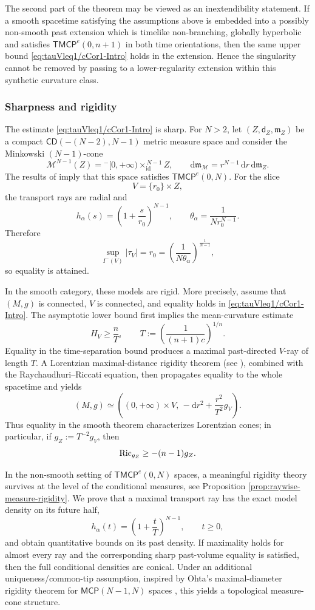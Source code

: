 \documentclass[a4paper,10pt]{article}
\newcommand{\CD}{\mathsf{CD}}
\newcommand{\MCP}{\mathsf{MCP}}
\newcommand{\Ric}{{\rm Ric}}
\newcommand{\TMCP}{\mathsf{TMCP}}
\newcommand{\mm}{\mathfrak m}
\newcommand{\sfd}{\mathsf d}
\theoremstyle{plain}
\theoremstyle{definition}
\numberwithin{equation}{section}
\begin{document}
The second part of the theorem may be viewed as an inextendibility statement. If a smooth
spacetime satisfying the assumptions above is embedded into a possibly
non-smooth past extension which is timelike non-branching, globally
hyperbolic and satisfies $\TMCP^e(0,n+1)$ in both time orientations, then
the same upper bound \eqref{eq:tauVleq1/cCor1-Intro} holds in the
extension. Hence the singularity cannot be removed by passing to a
lower-regularity extension within this synthetic curvature class.


\subsubsection*{Sharpness and rigidity}


The estimate \eqref{eq:tauVleq1/cCor1-Intro} is sharp. For $N>2$, let
$(Z,\sfd_Z,\mm_Z)$ be a compact
$\CD(-(N-2),N-1)$ metric measure space and consider the Minkowski
$(N-1)$-cone
\[
    \mathcal M^{N-1}(Z)
    =
    {}^{-}[0,+\infty)\times_{\mathrm{id}}^{\,N-1} Z,
    \qquad
    \mathrm d\mm_{\mathcal M}
    =
    r^{N-1}\,\mathrm dr\,\mathrm d\mm_Z.
\]
The results of \cite{CalistiKettererSaemann} imply that this space satisfies
$\TMCP^e(0,N)$. For the slice $$V=\{r_0\}\times Z,$$ the transport rays are
radial and
\[
    h_\alpha(s)
    =
    \left(1+\frac{s}{r_0}\right)^{N-1},
    \qquad
    \theta_\alpha
    =
    \frac1{N r_0^{N-1}}.
\]
Therefore
\[
    \sup_{I^-(V)}|\tau_V|
    =
    r_0
    =
    \left(\frac1{N\theta_\alpha}\right)^{\frac1{N-1}},
\]
so equality is attained.

In the smooth category, these models are rigid. More precisely, assume
that $(M,g)$ is connected, $V$ is connected, and equality holds in
\eqref{eq:tauVleq1/cCor1-Intro}. The asymptotic lower bound first
implies the mean-curvature estimate
\[
    H_V\geq \frac nT,
    \qquad
    T:=\left(\frac1{(n+1)c}\right)^{1/n}.
\]
Equality in the time-separation bound produces a maximal past-directed
$V$-ray of length $T$. A Lorentzian maximal-distance rigidity theorem (see \cite{GrafSplitting}),
combined with the Raychaudhuri--Riccati equation, then propagates equality
to the whole spacetime and yields
\[
    (M,g)
    \simeq
    \left(
    (0,+\infty)\times V,\,
    -\mathrm dr^2+\frac{r^2}{T^2}g_V
    \right).
\]
Thus equality in the smooth theorem characterizes Lorentzian cones; in
particular, if $g_Z:=T^{-2}g_V$, then
\[
    \Ric_{g_Z}\geq -(n-1)g_Z.
\]



In the non-smooth setting of $\TMCP^e(0,N)$ spaces, a meaningful rigidity theory survives at the level of the
conditional measures, see Proposition \ref{prop:raywise-measure-rigidity}. We prove that a maximal transport ray has the exact
model density on its future half,
\[
    h_\alpha(t)
    =
    \left(1+\frac tT\right)^{N-1},
    \qquad t\ge0,
\]
and obtain quantitative bounds on its past density. If maximality holds
for almost every ray and the corresponding sharp past-volume equality is
satisfied, then the full conditional densities are conical. Under an
additional uniqueness/common-tip assumption, inspired by Ohta's
maximal-diameter rigidity theorem for $\MCP(N-1,N)$ spaces
\cite[Theorem~5.5]{OhtaJLMS}, this yields a topological measure-cone
structure.
\end{document}
